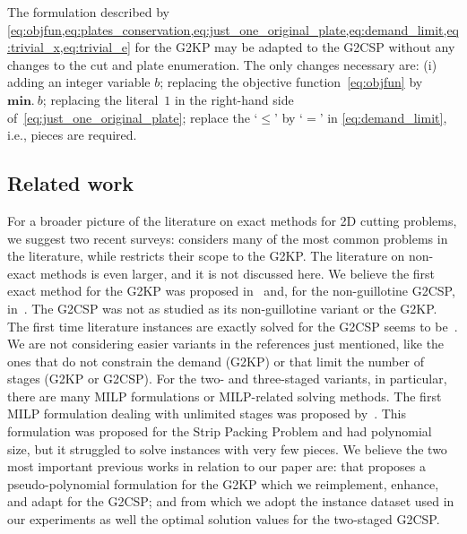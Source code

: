 \documentclass[9pt]{entcs}
\begin{document}
The formulation described by \cref{eq:objfun,eq:plates_conservation,eq:just_one_original_plate,eq:demand_limit,eq:trivial_x,eq:trivial_e} for the G2KP may be adapted to the G2CSP without any changes to the cut and plate enumeration.
The only changes necessary are: (i) adding an integer variable \(b\); replacing the objective function~\cref{eq:objfun} by~\(\bm{min.}~b\); replacing the literal~\(1\) in the right-hand side of~\cref{eq:just_one_original_plate}; replace the `\(\leq\)' by `\(=\)' in \eqref{eq:demand_limit}, i.e., pieces are required.

\subsection{Related work}

For a broader picture of the literature on exact methods for 2D cutting problems, we suggest two recent surveys: \cite{iori:2020} considers many of the most common problems in the literature, while \cite{russo:2020} restricts their scope to the G2KP.
The literature on non-exact methods is even larger, and it is not discussed here.
We believe the first exact method for the G2KP was proposed in~\cite{cw:1977} and, for the non-guillotine G2CSP, in~\cite{martello:1998}.
The G2CSP was not as studied as its non-guillotine variant or the G2KP.
The first time literature instances are exactly solved for the G2CSP seems to be~\cite{pisinger:2007}.
We are not considering easier variants in the references just mentioned, like the ones that do not constrain the demand (G2KP) or that limit the number of stages (G2KP or G2CSP).
For the two- and three-staged variants, in particular, there are many MILP formulations or MILP-related solving methods\cite{puchinger:2007,silva:2010,macedo:2010,furini:2013,nascimento:2019}.
The first MILP formulation dealing with unlimited stages was proposed by~\cite{messaoud:2008}.
This formulation was proposed for the Strip Packing Problem and had polynomial size, but it struggled to solve instances with very few pieces.
We believe the two most important previous works in relation to our paper are: \cite{furini:2016} that proposes a pseudo-polynomial formulation for the G2KP which we reimplement, enhance, and adapt for the G2CSP; and \cite{silva:2010} from which we adopt the instance dataset used in our experiments as well the optimal solution values for the two-staged G2CSP.
\end{document}
